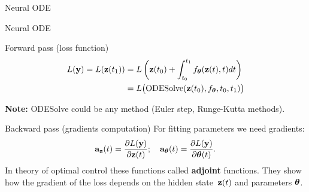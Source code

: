 \begin{frame}{Neural ODE}
\begin{minipage}[t]{0.6\columnwidth}
\begin{figure}
		\end{figure}
	\end{minipage}

\end{frame}
\begin{frame}{Neural ODE}
	\begin{block}{Forward pass (loss function)}
		\vspace{-0.8cm}
		\begin{align*}
			L(\mathbf{y}) = L(\mathbf{z}(t_1)) &= L\left( \mathbf{z}(t_0) + \int_{t_0}^{t_1} f_{\boldsymbol{\theta}}(\mathbf{z}(t), t) dt \right) \\ &= L\bigl(\text{ODESolve}(\mathbf{z}(t_0), f_{\boldsymbol{\theta}}, t_0,t_1) \bigr)
		\end{align*}
	\vspace{-0.5cm}
	\end{block}
	\textbf{Note:} ODESolve could be any method (Euler step, Runge-Kutta methods).
	\begin{block}{Backward pass (gradients computation)}
		For fitting parameters we need gradients:
		\[
			\mathbf{a}_{\mathbf{z}}(t) = \frac{\partial L(\mathbf{y})}{\partial \mathbf{z}(t)}; \quad \mathbf{a}_{\boldsymbol{\theta}}(t) = \frac{\partial L(\mathbf{y})}{\partial \boldsymbol{\theta}(t)}.
		\]
		In theory of optimal control these functions called \textbf{adjoint} functions. 
		They show how the gradient of the loss depends on the hidden state~$\mathbf{z}(t)$ and parameters $\boldsymbol{\theta}$.
	\end{block}

\end{frame}
